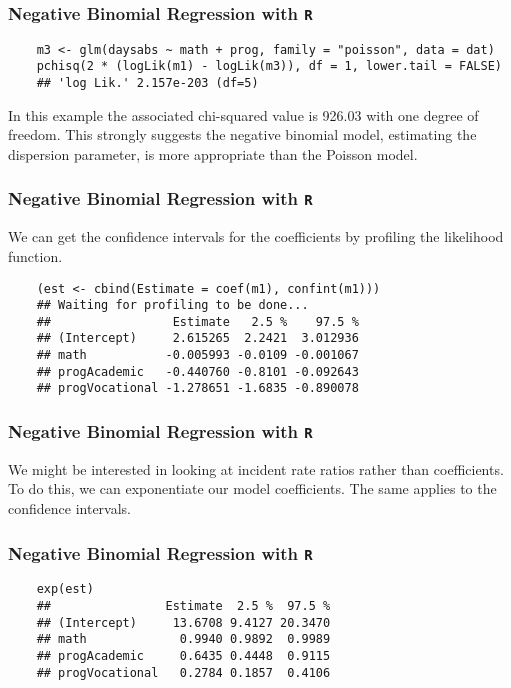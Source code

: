 \documentclass[00-GLMregslides.tex]{subfiles}
\begin{document}
\begin{frame}[fragile]
	\frametitle{Negative Binomial Regression with \texttt{R} }
	\Large
	\begin{verbatim}
	m3 <- glm(daysabs ~ math + prog, family = "poisson", data = dat)
	pchisq(2 * (logLik(m1) - logLik(m3)), df = 1, lower.tail = FALSE)
	## 'log Lik.' 2.157e-203 (df=5)
	\end{verbatim}
	In this example the associated chi-squared value is 926.03 with one degree of freedom. This strongly suggests the negative binomial model, estimating the dispersion parameter, is more appropriate than the Poisson model.
\end{frame}
\begin{frame}[fragile]
	\frametitle{Negative Binomial Regression with \texttt{R} }
	\Large
	
	We can get the confidence intervals for the coefficients by profiling the likelihood function.
	\begin{verbatim}
	(est <- cbind(Estimate = coef(m1), confint(m1)))
	## Waiting for profiling to be done...
	##                 Estimate   2.5 %    97.5 %
	## (Intercept)     2.615265  2.2421  3.012936
	## math           -0.005993 -0.0109 -0.001067
	## progAcademic   -0.440760 -0.8101 -0.092643
	## progVocational -1.278651 -1.6835 -0.890078
	\end{verbatim}
	
\end{frame}
\begin{frame}[fragile]
	\frametitle{Negative Binomial Regression with \texttt{R} }
	\Large
	
	We might be interested in looking at incident rate ratios rather than coefficients. To do this, we can exponentiate our model coefficients. The same applies to the confidence intervals.
\end{frame}
\begin{frame}[fragile]
	\frametitle{Negative Binomial Regression with \texttt{R} }
	\Large
	\begin{verbatim}	
	exp(est)
	##                Estimate  2.5 %  97.5 %
	## (Intercept)     13.6708 9.4127 20.3470
	## math             0.9940 0.9892  0.9989
	## progAcademic     0.6435 0.4448  0.9115
	## progVocational   0.2784 0.1857  0.4106
	\end{verbatim}
\end{frame}
\end{document}
